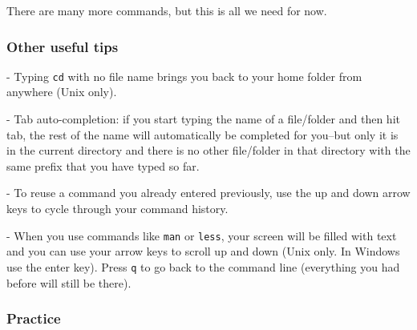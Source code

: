 \documentclass[english,12pt]{article}
\begin{document}
There are many more commands, but this is all we need for now.

\subsubsection*{Other useful tips}

\begin{list}{}{}
\item - Typing \texttt{cd} with no file name brings you back to your home folder from anywhere (Unix only).
\item - Tab auto-completion: if you start typing the name of a file/folder and then hit tab, the rest of the name will automatically be completed for you--but only it is in the current directory and there is no other file/folder in that directory with the same prefix that you have typed so far.
\item - To reuse a command you already entered previously, use the up and down arrow keys to cycle through your command history.
\item - When you use commands like \texttt{man} or \texttt{less}, your screen will be filled with text and you can use your arrow keys to scroll up and down (Unix only. In Windows use the enter key). Press \texttt{q} to go back to the command line (everything you had before will still be there).
\end{list}



\subsubsection*{Practice}
\end{document}
